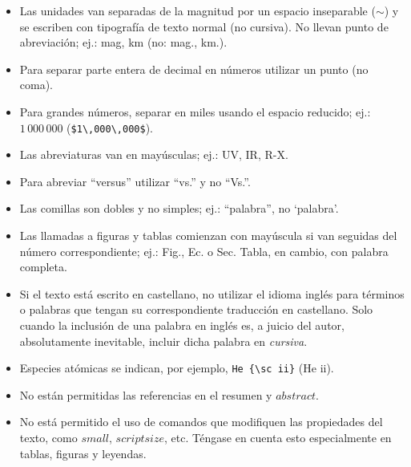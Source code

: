 \documentclass[baaa]{baaa}
\begin{document}
\begin{itemize}
  \item Las unidades van separadas de la magnitud por un espacio inseparable ($\sim$) y
        se escriben con tipografía de texto normal (no cursiva).
        No llevan punto de abreviación; ej.: mag, km (no: mag., km.).
  \item Para separar parte entera de decimal en números utilizar un punto (no coma).
  \item Para grandes números, separar en miles usando el espacio reducido; ej.: $1\,000\,000$ (\verb+$1\,000\,000$+).
  \item Las abreviaturas van en mayúsculas; ej.: UV, IR, R-X.
  \item Para abreviar ``versus'' utilizar ``vs.'' y no ``Vs.''.
  \item Las comillas son dobles y no simples; ej.: ``palabra'', no `palabra'.
  \item Las llamadas a figuras y tablas comienzan con mayúscula si van seguidas del número correspondiente; 
        ej.: Fig., Ec. o Sec. 
        Tabla, en cambio, con palabra completa.
  \item Si el texto está escrito en castellano, no utilizar el idioma inglés para términos o palabras que tengan 
        su correspondiente traducción en castellano. Solo cuando la inclusión de una palabra en inglés es, 
        a juicio del autor, absolutamente inevitable, incluir dicha palabra en {\em cursiva}.
  \item Especies atómicas se indican, por ejemplo, \verb|He {\sc ii}| (He {\sc ii}).
  \item No están permitidas las referencias en el resumen y $abstract$.
\item No está permitido el uso de comandos que modifiquen las propiedades del texto, como
      $small$, $scriptsize$, etc. Téngase en cuenta esto especialmente en tablas, figuras
      y leyendas.
\end{itemize}
\end{document}
